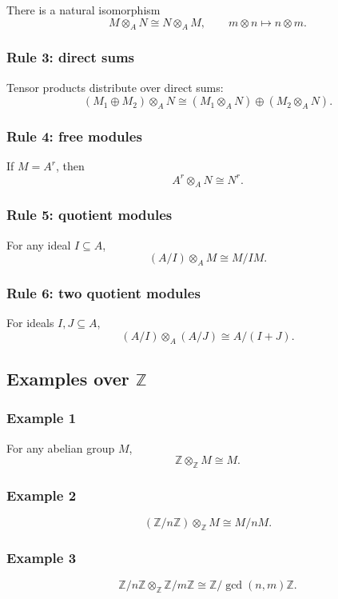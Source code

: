 \documentclass[12pt,a4paper]{article}
\theoremstyle{notespace}
\begin{document}
There is a natural isomorphism
\[
M\otimes_A N\cong N\otimes_A M,
\qquad
m\otimes n \mapsto n\otimes m.
\]

\subsubsection*{Rule 3: direct sums}

Tensor products distribute over direct sums:
\[
(M_1\oplus M_2)\otimes_A N
\cong
(M_1\otimes_A N)\oplus(M_2\otimes_A N).
\]

\subsubsection*{Rule 4: free modules}

If \(M=A^r\), then
\[
A^r\otimes_A N\cong N^r.
\]

\subsubsection*{Rule 5: quotient modules}

For any ideal \(I\subseteq A\),
\[
(A/I)\otimes_A M \cong M/IM.
\]

\subsubsection*{Rule 6: two quotient modules}

For ideals \(I,J\subseteq A\),
\[
(A/I)\otimes_A (A/J)\cong A/(I+J).
\]

\subsection{Examples over \(\mathbb Z\)}

\subsubsection*{Example 1}
For any abelian group \(M\),
\[
\mathbb Z\otimes_{\mathbb Z} M\cong M.
\]

\subsubsection*{Example 2}
\[
(\mathbb Z/n\mathbb Z)\otimes_{\mathbb Z} M\cong M/nM.
\]

\subsubsection*{Example 3}
\[
\mathbb Z/n\mathbb Z\otimes_{\mathbb Z}\mathbb Z/m\mathbb Z
\cong
\mathbb Z/\gcd(n,m)\mathbb Z.
\]
\end{document}
